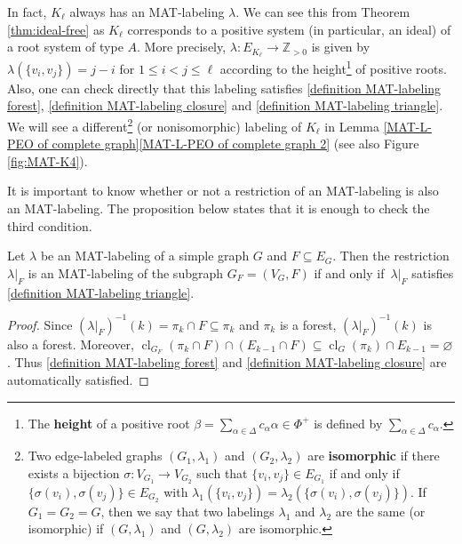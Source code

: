\documentclass[ALCO, Unicode,published]{cedram}
\DeclareMathOperator{\cl}{cl}
\begin{document}
\begin{remark}
\label{rem:complete}
In fact, $ K_{\ell} $ always has an MAT-labeling $\lambda$. 
We can see this from Theorem \ref{thm:ideal-free} as $ K_{\ell} $ corresponds to a positive system (in particular, an ideal) of a root system of type $A$. 
More precisely,  $ \lambda \colon E_{K_{\ell}} \to \mathbb{Z}_{>0} $ is given by $ \lambda(\{v_{i}, v_{j}\}) = j-i$ for $1\le i < j \le \ell$ according to the height\footnote{The \textbf{height} of a positive root $\beta = \sum_{\alpha\in \Delta} c_\alpha \alpha \in \Phi^+$ is defined by $\sum_{\alpha\in \Delta} c_\alpha$.} 
 of positive roots. 
 Also, one can check directly that this labeling satisfies \ref{definition MAT-labeling forest}, \ref{definition MAT-labeling closure} and \ref{definition MAT-labeling triangle}.
We will see a different\footnote{Two edge-labeled graphs $(G_1,\lambda_1)$ and $(G_2, \lambda_2)$ are \textbf{isomorphic} if there exists a bijection $\sigma :V_{G_1} \to V_{G_2}$ such that $\{v_{i}, v_{j}\} \in E_{G_1}$ if and only if $\{\sigma(v_{i}), \sigma(v_{j})\} \in E_{G_2}$   with $ \lambda_1(\{v_{i}, v_{j}\}) =  \lambda_2(\{\sigma(v_{i}), \sigma(v_{j})\})$. If $G_1=G_2=G$, then we say that two labelings $\lambda_1$ and $ \lambda_2$ are the same (or isomorphic) if $(G,\lambda_1)$ and $(G, \lambda_2)$ are isomorphic.}  
(or nonisomorphic) labeling of $ K_{\ell} $ in Lemma \ref{MAT-L-PEO of complete graph}\ref{MAT-L-PEO of complete graph 2} (see also Figure \ref{fig:MAT-K4}). 

\end{remark}

It is important to know whether or not a restriction of an MAT-labeling is also an MAT-labeling. 
The proposition below states that it is enough to check the third condition.
\begin{proposition}\label{restriction to subset}
Let $ \lambda $ be an MAT-labeling of a simple graph $ G $ and $ F \subseteq E_{G} $. 
Then the restriction $ \lambda|_{F} $ is an MAT-labeling of the subgraph $ G_{F}= (V_{G}, F) $ if and only if~$ \lambda|_{F} $ satisfies \ref{definition MAT-labeling triangle}. 
\end{proposition}
\begin{proof}
Since $ (\lambda|_{F})^{-1}(k) = \pi_{k} \cap F \subseteq \pi_{k} $ and $ \pi_{k} $ is a forest, $ (\lambda|_{F})^{-1}(k) $ is also a forest. 
Moreover, $ \cl_{G_{F}}(\pi_{k} \cap F) \cap (E_{k-1} \cap F) \subseteq \cl_{G}(\pi_{k}) \cap E_{k-1} = \varnothing $. 
Thus  \ref{definition MAT-labeling forest} and \ref{definition MAT-labeling closure} are automatically satisfied. 
\end{proof}
\end{document}
